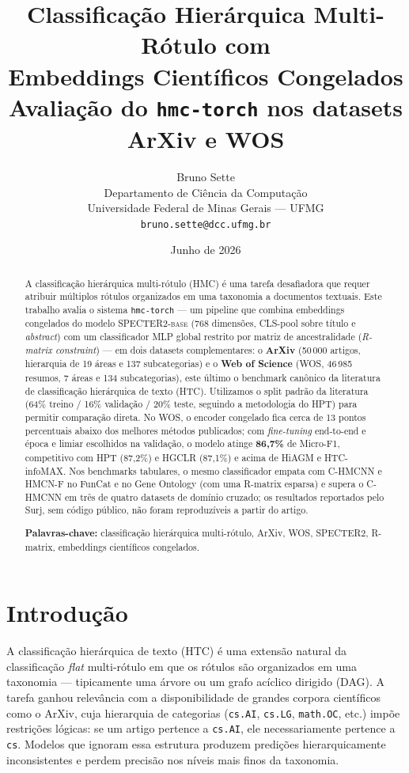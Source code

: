 \documentclass[11pt,a4paper,twoside]{article}
\title{
  {\LARGE Classificação Hierárquica Multi-Rótulo com}\\[0.3em]
  {\LARGE Embeddings Científicos Congelados}\\[0.6em]
  {\large Avaliação do \texttt{hmc-torch} nos datasets ArXiv e WOS}
}
\author{
  Bruno Sette\\[0.3em]
  \small Departamento de Ciência da Computação\\[0.1em]
  \small Universidade Federal de Minas Gerais --- UFMG\\[0.4em]
  \small\texttt{bruno.sette@dcc.ufmg.br}
}
\date{\small Junho de 2026}
\begin{document}
\maketitle

\begin{abstract}
A classificação hierárquica multi-rótulo (HMC) é uma tarefa desafiadora que requer
atribuir múltiplos rótulos organizados em uma taxonomia a documentos textuais. Este
trabalho avalia o sistema \texttt{hmc-torch} --- um pipeline que combina embeddings
congelados do modelo \textsc{SPECTER2-base} (768 dimensões, CLS-pool sobre título e
\textit{abstract}) com um classificador MLP global restrito por matriz de
ancestralidade (\textit{R-matrix constraint}) --- em dois datasets complementares:
o \textbf{ArXiv} (50\,000 artigos, hierarquia de 19 áreas e 137 subcategorias) e o
\textbf{Web of Science} (WOS, 46\,985 resumos, 7 áreas e 134 subcategorias), este
último o benchmark canônico da literatura de classificação hierárquica de texto (HTC).
Utilizamos o split padrão da literatura (64\% treino / 16\% validação / 20\% teste,
seguindo a metodologia do HPT) para permitir comparação direta. No WOS, o encoder
congelado fica cerca de 13 pontos percentuais abaixo dos melhores métodos
publicados; com \textit{fine-tuning} end-to-end e época e limiar escolhidos na
validação, o modelo atinge \textbf{86,7\%} de Micro-F1, competitivo com HPT
(87,2\%) e HGCLR (87,1\%) e acima de HiAGM e HTC-infoMAX. Nos benchmarks
tabulares, o mesmo classificador empata com C-HMCNN e HMCN-F no FunCat e no Gene
Ontology (com uma R-matrix esparsa) e supera o C-HMCNN em três de quatro datasets
de domínio cruzado; os resultados reportados pelo Surj, sem código público, não
foram reproduzíveis a partir do artigo.

\vspace{0.6em}
\noindent\textbf{Palavras-chave:} classificação hierárquica multi-rótulo,
ArXiv, WOS, SPECTER2, R-matrix, embeddings científicos congelados.
\end{abstract}

\section{Introdução}

A classificação hierárquica de texto (HTC) é uma extensão natural da classificação
\textit{flat} multi-rótulo em que os rótulos são organizados em uma taxonomia ---
tipicamente uma árvore ou um grafo acíclico dirigido (DAG). A tarefa ganhou relevância
com a disponibilidade de grandes corpora científicos como o ArXiv, cuja hierarquia de
categorias (\texttt{cs.AI}, \texttt{cs.LG}, \texttt{math.OC}, etc.) impõe restrições
lógicas: se um artigo pertence a \texttt{cs.AI}, ele necessariamente pertence a
\texttt{cs}. Modelos que ignoram essa estrutura produzem predições hierarquicamente
inconsistentes e perdem precisão nos níveis mais finos da taxonomia.
\end{document}
